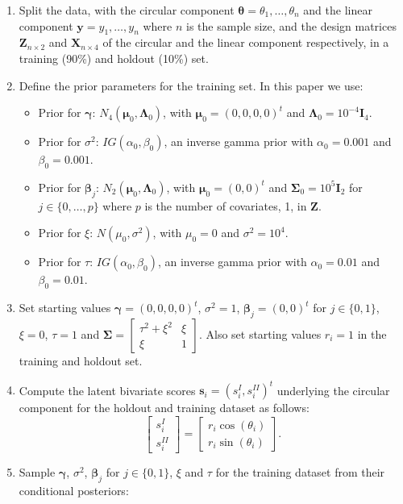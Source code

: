 \documentclass[12pt,]{article}
\begin{document}
\begin{enumerate}
\item Split the data, with the circular component $\boldsymbol{\theta} = \theta_1, \dots, \theta_n$ and the linear component $\boldsymbol{y} = y_1, \dots, y_n$ where $n$ is the sample size, and the design matrices $\boldsymbol{Z}_{n \times 2}$  and $\boldsymbol{X}_{n \times 4}$ of the circular and the linear component respectively, in a training (90\%) and holdout (10\%) set. 
\item Define the prior parameters for the training set. In this paper we use:

\begin{itemize}
\item Prior for $\boldsymbol{\gamma}$: $N_4(\boldsymbol{\mu}_{0}, \boldsymbol{\Lambda}_{0})$, with $\boldsymbol{\mu}_{0} = (0,0,0,0)^t$ and $\boldsymbol{\Lambda}_{0} = 10^{-4}\boldsymbol{I}_4$.
\item Prior for $\sigma^2$: $IG(\alpha_{0}, \beta_{0})$, an inverse gamma prior with $\alpha_{0} = 0.001$ and $\beta_{0} = 0.001$.
\item Prior for $\boldsymbol{\beta}_{j}$: $N_2(\boldsymbol{\mu}_{0}, \boldsymbol{\Lambda}_0)$, with $\boldsymbol{\mu}_{0} = (0,0)^t$ and  $\boldsymbol{\Sigma}_{0} = 10^{5}\boldsymbol{I}_2$ for $j \in \{0, \dots, p\}$ where $p$ is the number of covariates, 1, in $\boldsymbol{Z}$.
\item Prior for $\xi$: $N(\mu_0, \sigma^2)$, with $\mu_0 = 0$ and $\sigma^2 = 10^{4}$.
\item Prior for $\tau$: $IG(\alpha_{0}, \beta_{0})$, an inverse gamma prior with $\alpha_{0} = 0.01$ and $\beta_{0} = 0.01$.
\end{itemize}

\item Set starting values $\boldsymbol{\gamma} = (0,0,0,0)^t$, $\sigma^2 = 1$, $\boldsymbol{\beta}_j = (0,0)^t$ for $j \in \{0,1\}$, $\xi = 0$, $\tau = 1$ and $\boldsymbol{\Sigma} = \begin{bmatrix} \tau^2 + \xi^2 & \xi\\ \xi & 1 \end{bmatrix}$. Also set starting values $r_i = 1$ in the training and holdout set. 
\item Compute the latent bivariate scores $\boldsymbol{s}_i = (s_i^{I}, s_i^{II})^t$ underlying the circular component for the holdout and training dataset as follows:
$$\begin{bmatrix} s^{I}_{i} \\ s^{II}_{i} \end{bmatrix} = \begin{bmatrix} r_i \cos (\theta_i) \\  r_i\sin (\theta_i)\end{bmatrix}.$$
\item Sample $\boldsymbol{\gamma}$, $\sigma^2$, $\boldsymbol{\beta}_j$ for $j \in \{0,1\}$, $\xi$ and $\tau$ for the training dataset from their conditional posteriors:


\end{enumerate}
\end{document}

